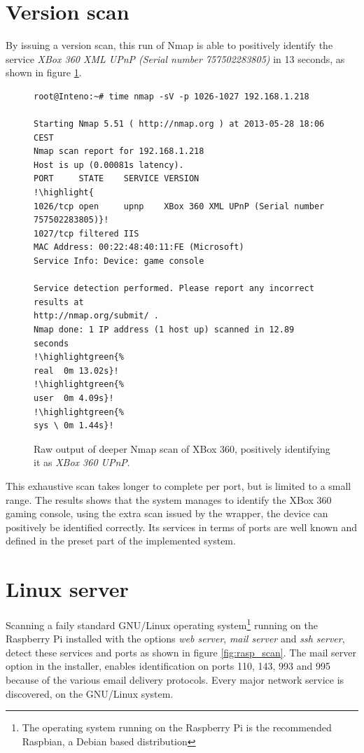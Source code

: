 \documentclass[a4paper,11pt,makeidx]{kth-bcs}
\newcommand{\reducedstrut}{\vrule width 0pt height .9\ht\strutbox depth .9\dp\strutbox\relax}
\newcommand{\highlight}[1]{%
  \begingroup
  \colorbox{light-gray!20}{\footnotesize\ttfamily#1\/}%
  \endgroup
}
\newcommand{\highlightgreen}[1]{%
  \begingroup
  \colorbox{light-green!20}{#1\/}%
  \endgroup
}
\begin{document}
\newpage
\section{Version scan}
By issuing a version scan, this run of Nmap is able to positively identify the service \emph{XBox 360 XML UPnP (Serial number 757502283805)} in 13 seconds, as shown in figure \ref{fig:nmapxbox}.
   \begin{figure}[h!]
      \centering
      \begin{lstlisting}[escapechar=!]
root@Inteno:~# time nmap -sV -p 1026-1027 192.168.1.218

Starting Nmap 5.51 ( http://nmap.org ) at 2013-05-28 18:06 CEST
Nmap scan report for 192.168.1.218
Host is up (0.00081s latency).
PORT     STATE    SERVICE VERSION
!\highlight{
1026/tcp open     upnp    XBox 360 XML UPnP (Serial number 757502283805)}!
1027/tcp filtered IIS
MAC Address: 00:22:48:40:11:FE (Microsoft)
Service Info: Device: game console

Service detection performed. Please report any incorrect results at
http://nmap.org/submit/ .
Nmap done: 1 IP address (1 host up) scanned in 12.89 seconds
!\highlightgreen{%
real  0m 13.02s}!
!\highlightgreen{%
user  0m 4.09s}!
!\highlightgreen{%
sys \ 0m 1.44s}!
      \end{lstlisting}
      \caption{
	 \small{
       Raw output of deeper Nmap scan of XBox 360, positively identifying it as \emph{XBox 360 UPnP}.
	 }
      }
      \label{fig:nmapxbox}
   \end{figure}

This exhaustive scan takes longer to complete per port, but is limited to a small range.
The results shows that the system manages to identify the XBox 360 gaming console, using the extra scan issued by the wrapper, the device can positively be identified correctly.
Its services in terms of ports are well known and defined in the preset part of the implemented system.

\section{Linux server}
Scanning a faily standard GNU/Linux operating system\footnote{The operating system running on the Raspberry Pi is the recommended Raspbian, a Debian based distribution} running on the Raspberry Pi installed with the options \emph{web server}, \emph{mail server} and \emph{ssh server}, detect these services and ports as shown in figure \ref{fig:rasp_scan}.
The mail server option in the installer, enables identification on ports 110, 143, 993 and 995 because of the various email delivery protocols.
Every major network service is discovered, on the GNU/Linux system.
\end{document}
